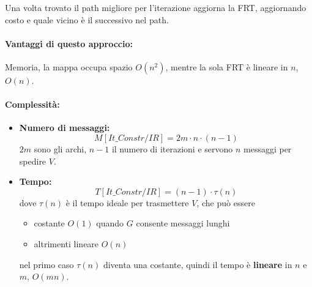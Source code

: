 Una volta trovato il path migliore per l'iterazione aggiorna la FRT, aggiornando costo e quale vicino è il successivo nel path.\\

\paragraph{Vantaggi di questo approccio:} Memoria, la mappa occupa spazio $O(n^2)$, mentre la sola FRT è lineare in $n$, $O(n)$.\\

\paragraph{Complessità:} 
\begin{itemize}
	\item \textbf{Numero di messaggi:}
	$$ M[It\_Constr/IR] = 2m \cdot n \cdot (n-1) $$
	$2m$ sono gli archi, $n-1$ il numero di iterazioni e servono $n$ messaggi per spedire $V$.\\
	
	\item \textbf{Tempo:}
	$$ T[It\_Constr/IR] = (n-1) \cdot \tau(n)$$
	dove $\tau(n)$ è il tempo ideale per trasmettere $V$, che può essere
	\begin{itemize}
		\item costante $O(1)$ quando $G$ consente messaggi lunghi 
		\item altrimenti lineare $O(n)$
	\end{itemize}
	nel primo caso $\tau(n)$ diventa una costante, quindi il tempo è \textbf{lineare} in $n$ e $m$, $O(mn)$.\\
\end{itemize}

